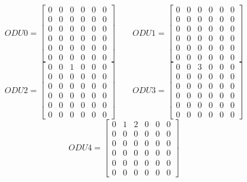 \[
ODU0=
	\begin{bmatrix}
		0 & 0 & 0 & 0 & 0 & 0 \\
		0 & 0 & 0 & 0 & 0 & 0 \\
		0 & 0 & 0 & 0 & 0 & 0 \\
		0 & 0 & 0 & 0 & 0 & 0 \\
		0 & 0 & 0 & 0 & 0 & 0 \\
		0 & 0 & 0 & 0 & 0 & 0
	\end{bmatrix}
\qquad ODU1=
	\begin{bmatrix}
		0 & 0 & 0 & 0 & 0 & 0 \\
		0 & 0 & 0 & 0 & 0 & 0 \\
		0 & 0 & 0 & 0 & 0 & 0 \\
		0 & 0 & 0 & 0 & 0 & 0 \\
		0 & 0 & 0 & 0 & 0 & 0 \\
		0 & 0 & 0 & 0 & 0 & 0
	\end{bmatrix}
\]
\[
ODU2=
	\begin{bmatrix}
		0 & 0 & 1 & 0 & 0 & 0 \\
		0 & 0 & 0 & 0 & 0 & 0 \\
		0 & 0 & 0 & 0 & 0 & 0 \\
		0 & 0 & 0 & 0 & 0 & 0 \\
		0 & 0 & 0 & 0 & 0 & 0 \\
		0 & 0 & 0 & 0 & 0 & 0
	\end{bmatrix}
\qquad ODU3=
	\begin{bmatrix}
		0 & 0 & 3 & 0 & 0 & 0 \\
		0 & 0 & 0 & 0 & 0 & 0 \\
		0 & 0 & 0 & 0 & 0 & 0 \\
		0 & 0 & 0 & 0 & 0 & 0 \\
		0 & 0 & 0 & 0 & 0 & 0 \\
		0 & 0 & 0 & 0 & 0 & 0
	\end{bmatrix}
\]
\[
ODU4=
	\begin{bmatrix}
		0 & 1 & 2 & 0 & 0 & 0 \\
		0 & 0 & 0 & 0 & 0 & 0 \\
		0 & 0 & 0 & 0 & 0 & 0 \\
		0 & 0 & 0 & 0 & 0 & 0 \\
		0 & 0 & 0 & 0 & 0 & 0 \\
		0 & 0 & 0 & 0 & 0 & 0
	\end{bmatrix}
\]

